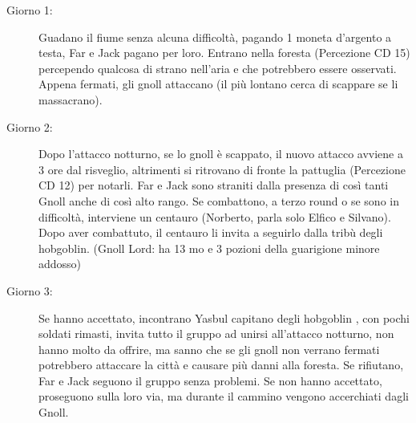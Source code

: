 \documentclass{article}
\begin{document}
\begin{description}
    \item[Giorno 1:] Guadano il fiume senza alcuna difficoltà, pagando 1 moneta d'argento a testa, Far e Jack pagano per loro. Entrano nella foresta (Percezione CD 15) percependo qualcosa di strano nell'aria e che potrebbero essere osservati. Appena fermati, gli gnoll attaccano (il più lontano cerca di scappare se li massacrano).
    
    \item[Giorno 2:] Dopo l'attacco notturno, se lo gnoll è scappato, il nuovo attacco avviene a 3 ore dal risveglio, altrimenti si ritrovano di fronte la pattuglia (Percezione CD 12) per notarli. Far e Jack sono straniti dalla presenza di così tanti Gnoll anche di così alto rango. Se combattono, a terzo round o se sono in difficoltà, interviene un centauro (Norberto, parla solo Elfico e Silvano). Dopo aver combattuto, il centauro li invita a seguirlo dalla tribù degli hobgoblin. (Gnoll Lord: ha 13 mo e 3 pozioni della guarigione minore addosso)
    
    \item[Giorno 3:] Se hanno accettato, incontrano Yasbul capitano degli hobgoblin , con pochi soldati rimasti, invita tutto il gruppo ad unirsi all'attacco notturno, non hanno molto da offrire, ma sanno che se gli gnoll non verrano fermati potrebbero attaccare la città e causare più danni alla foresta. Se rifiutano, Far e Jack seguono il gruppo senza problemi. Se non hanno accettato, proseguono sulla loro via, ma durante il cammino vengono accerchiati dagli Gnoll. 
                    

\end{description}
\end{document}
